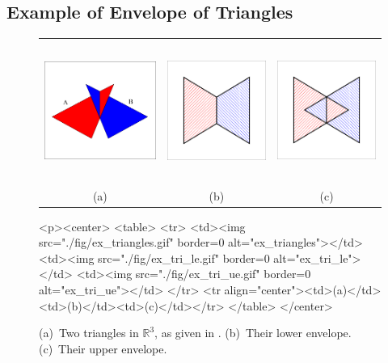 \subsection{Example of Envelope of Triangles}

\begin{figure}[t]
\begin{ccTexOnly}
  \begin{center}
  \begin{tabular}{ccc}
    \includegraphics[height=1.8in]{Envelope_3/fig/ex_triangles} &
    \includegraphics[height=1.8in]{Envelope_3/fig/ex_tri_le} &
    \includegraphics[height=1.8in]{Envelope_3/fig/ex_tri_ue} \\
    {\small (a)} & {\small (b)} & {\small (c)}
  \end{tabular}
  \end{center}
\end{ccTexOnly}
\begin{ccHtmlOnly}
  <p><center>
  <table>
  <tr>
  <td><img src="./fig/ex_triangles.gif" border=0 alt="ex_triangles"></td>
  <td><img src="./fig/ex_tri_le.gif" border=0 alt="ex_tri_le"></td>
  <td><img src="./fig/ex_tri_ue.gif" border=0 alt="ex_tri_ue"></td>
  </tr>
  <tr align="center"><td>(a)</td><td>(b)</td><td>(c)</td></tr>
  </table>
  </center>
\end{ccHtmlOnly}
\caption{(a)~Two triangles in ${\mathbb R}^3$, as given in
. (b)~Their lower envelope.
(c)~Their upper envelope.\label{env3_fig:ex_tri}}
\end{figure}

